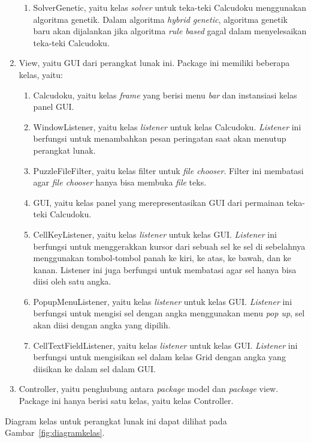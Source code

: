 \begin{enumerate}
\begin{enumerate}
	\item SolverGenetic, yaitu kelas \textit{solver} untuk teka-teki Calcudoku menggunakan algoritma genetik. Dalam algoritma \textit{hybrid genetic}, algoritma genetik baru akan dijalankan jika algoritma \textit{rule based} gagal dalam menyelesaikan teka-teki Calcudoku.
	\end{enumerate}
\item View, yaitu GUI dari perangkat lunak ini. Package ini memiliki beberapa kelas, yaitu:
	\begin{enumerate}
	\item Calcudoku, yaitu kelas \textit{frame} yang berisi menu \textit{bar} dan instansiasi kelas panel GUI.
	\item WindowListener, yaitu kelas \textit{listener} untuk kelas Calcudoku. \textit{Listener} ini berfungsi untuk menambahkan pesan peringatan saat akan menutup perangkat lunak.
	\item PuzzleFileFilter, yaitu kelas filter untuk \textit{file chooser}. Filter ini membatasi agar \textit{file chooser} hanya bisa membuka \textit{file} teks.
	\item GUI, yaitu kelas panel yang merepresentasikan GUI dari permainan teka-teki Calcudoku.
	\item CellKeyListener, yaitu kelas \textit{listener} untuk kelas GUI. \textit{Listener} ini berfungsi untuk menggerakkan kursor dari sebuah sel ke sel di sebelahnya menggunakan tombol-tombol panah ke kiri, ke atas, ke bawah, dan ke kanan. Listener ini juga berfungsi untuk membatasi agar sel hanya bisa diisi oleh satu angka.
	\item PopupMenuListener, yaitu kelas \textit{listener} untuk kelas GUI. \textit{Listener} ini berfungsi untuk mengisi sel dengan angka menggunakan menu \textit{pop up}, sel akan diisi dengan angka yang dipilih.
	\item CellTextFieldListener, yaitu kelas \textit{listener} untuk kelas GUI. \textit{Listener} ini berfungsi untuk mengisikan sel dalam kelas Grid dengan angka yang diisikan ke dalam sel dalam GUI.
	\end{enumerate}
\item Controller, yaitu penghubung antara \textit{package} model dan \textit{package} view. Package ini hanya berisi satu kelas, yaitu kelas Controller.
\end{enumerate}

Diagram kelas untuk perangkat lunak ini dapat dilihat pada Gambar~\ref{fig:diagramkelas}.

